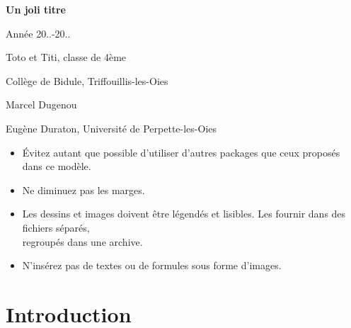 \documentclass[a4paper,french,11pt]{article}
\theoremstyle{definition}\newtheorem{defn}{Definition}
\theoremstyle{remark}\newtheorem{rem}{Remarque}
\newcounter{note}
\begin{document}
\thispagestyle{empty}
\begin{center}

\vspace{10ex}
\huge\sffamily\textbf{Un joli titre}

\vspace{3ex}
\large
Année 20..-20..

\vspace{3ex}
Toto et Titi, classe de 4ème
\end{center}
\vspace{2ex}
{\sffamily \large
{} Collège de Bidule, Triffouillis-les-Oies

\vspace{.5ex}
 Marcel Dugenou

\vspace{.5ex}
 Eugène Duraton, Université de Perpette-les-Oies
}

\vspace{2ex}
\begin{itemize}\color{red}\em
	\item \'Evitez autant que possible d'utiliser d'autres packages que ceux proposés dans ce modèle.
    \item Ne diminuez pas les marges. 
    \item Les dessins et images doivent être légendés et lisibles. Les fournir dans des fichiers séparés,\\ regroupés dans une archive.
    \item N'insérez pas de textes ou de formules sous forme d'images.
\end{itemize}
\section{Introduction}
\end{document}

